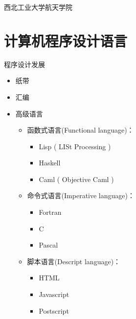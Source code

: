 

\def\lecturename{嵌入式技术}

\title{\insertlecture}

\author{邢超}

\institute
{
  西北工业大学航天学院
}


\subtitle{混合语言程序设计}
\date{2015}



\begin{frame}
  \maketitle
\end{frame}


\section{计算机程序设计语言}
\begin{frame}{程序设计发展}
\begin{itemize}
\item 纸带
\item 汇编
\item 高级语言
\begin{itemize}
\item 函数式语言(Functional language)：
\begin{itemize}
\item Lisp ( LISt Processing )
\item Haskell
\item Caml ( Objective Caml )
\end{itemize}
\item 命令式语言(Imperative language)：
\begin{itemize}
\item Fortran
\item C
\item Pascal
\end{itemize}
\item 脚本语言(Descript language)：
\begin{itemize}
\item HTML
\item Javascript
\item Postscript
\end{itemize}
\end{itemize}
\end{itemize}
\end{frame}

